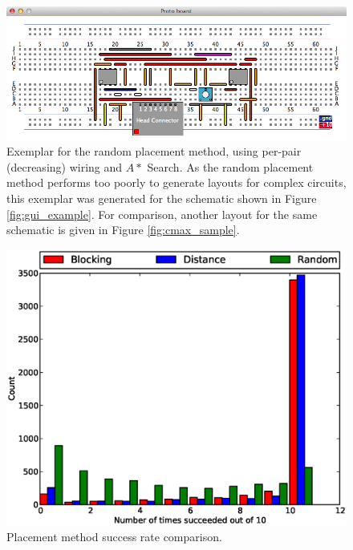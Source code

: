 \begin{figure}[H]
\begin{center}
\includegraphics[width=\textwidth]{Images/exemplar_random_placement.png}
\caption[Random placement method exemplar]{Exemplar for the random placement
method, using per-pair (decreasing) wiring and
$A*$ Search. As the random
placement method performs too poorly to generate layouts for complex circuits,
this exemplar was
generated for the schematic shown in Figure \ref{fig:gui_example}.
For comparison, another layout for the same schematic is given in Figure
\ref{fig:cmax_sample}.}
\end{center}
\end{figure}

\begin{figure}[H]
\begin{center}
\includegraphics[width=\textwidth]{Images/placement_success_comparison.eps}
\caption[Placement method success rate comparison]{Placement method success rate
comparison.}
\label{fig:placement_success}
\end{center}
\end{figure}


